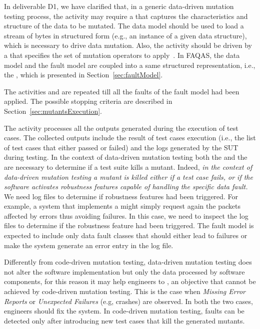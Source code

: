 
	
	
In deliverable D1, we have clarified that, in a generic data-driven mutation testing process, the activity  may require a  that captures the characteristics and structure of the data to be mutated. 
The data model should be used to load a stream of bytes in structured form (e.g., an instance of a given data structure), which is necessary to drive data mutation. 
Also, the activity  should be driven by a  that specifies the set of mutation operators to apply~\cite{di2015generating}. 
In FAQAS, the data model and the fault model are coupled into a same structured representation, i.e., the , which is presented in Section~\ref{sec:faultModel}.


The activities  and  are repeated till all the faults of the fault model had been applied. The possible stopping criteria are described in Section~\ref{sec:mutantsExecution}. 

The activity  processes all the outputs generated during the execution of test cases.
The collected outputs include the result of test cases execution (i.e., the list of test cases that either passed or failed) and the logs generated by the SUT during testing.
In the context of data-driven mutation testing both the  and the  are necessary to determine if a test suite kills a mutant.
Indeed, \emph{in the context of data-driven mutation testing a mutant is killed either if a test case fails, or if the software activates robustness features capable of handling the specific data fault.}
We need log files to determine if robustness features had been triggered.
For example, a system that implements a  might simply request again the packets affected by errors thus avoiding failures. In this case, we need to inspect the log files to determine if the robustness feature had been triggered.
The fault model is expected to include only data fault classes that should either lead to failures or make the system generate an error entry in the log file.

Differently from code-driven mutation testing, data-driven mutation testing does not alter the software implementation but only the data processed by software components, for this reason it may help engineers to , an objective that cannot be achieved by code-driven mutation testing. 
This is the case when \emph{Missing Error Reports} or \emph{Unexpected Failures }(e.g, crashes) are observed. In both the two cases, engineers should fix the system. In code-driven mutation testing, faults can be detected only after introducing new test cases that kill the generated mutants.

